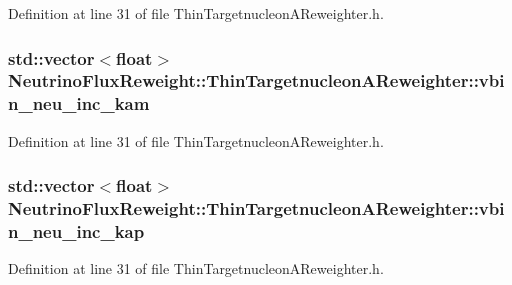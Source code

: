 Definition at line 31 of file Thin\-Targetnucleon\-A\-Reweighter.\-h.

\hypertarget{class_neutrino_flux_reweight_1_1_thin_targetnucleon_a_reweighter_a7c77ff20d31c4d95447e593726d267b0}{
\subsubsection[{vbin\-\_\-neu\-\_\-inc\-\_\-kam}]{\setlength{\rightskip}{0pt plus 5cm}std\-::vector$<$float$>$ Neutrino\-Flux\-Reweight\-::\-Thin\-Targetnucleon\-A\-Reweighter\-::vbin\-\_\-neu\-\_\-inc\-\_\-kam}}\label{class_neutrino_flux_reweight_1_1_thin_targetnucleon_a_reweighter_a7c77ff20d31c4d95447e593726d267b0}


Definition at line 31 of file Thin\-Targetnucleon\-A\-Reweighter.\-h.

\hypertarget{class_neutrino_flux_reweight_1_1_thin_targetnucleon_a_reweighter_a1ec58cec8bcce352e693785f7f7c7904}{
\subsubsection[{vbin\-\_\-neu\-\_\-inc\-\_\-kap}]{\setlength{\rightskip}{0pt plus 5cm}std\-::vector$<$float$>$ Neutrino\-Flux\-Reweight\-::\-Thin\-Targetnucleon\-A\-Reweighter\-::vbin\-\_\-neu\-\_\-inc\-\_\-kap}}\label{class_neutrino_flux_reweight_1_1_thin_targetnucleon_a_reweighter_a1ec58cec8bcce352e693785f7f7c7904}


Definition at line 31 of file Thin\-Targetnucleon\-A\-Reweighter.\-h.

